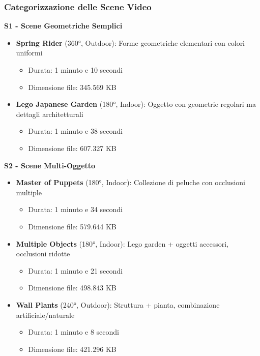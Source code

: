 \subsubsection{Categorizzazione delle Scene Video}

\textbf{S1 - Scene Geometriche Semplici}
\begin{itemize}
	\item \textbf{Spring Rider} (360°, Outdoor): Forme geometriche elementari con colori uniformi
	\begin{itemize}
		\item Durata: 1 minuto e 10 secondi
		\item Dimensione file: 345.569 KB
	\end{itemize}
	
	\item \textbf{Lego Japanese Garden} (180°, Indoor): Oggetto con geometrie regolari ma dettagli architetturali
	\begin{itemize}
		\item Durata: 1 minuto e 38 secondi  
		\item Dimensione file: 607.327 KB
	\end{itemize}
\end{itemize}

\textbf{S2 - Scene Multi-Oggetto}
\begin{itemize}
	\item \textbf{Master of Puppets} (180°, Indoor): Collezione di peluche con occlusioni multiple
	\begin{itemize}
		\item Durata: 1 minuto e 34 secondi
		\item Dimensione file: 579.644 KB
	\end{itemize}
	
	\item \textbf{Multiple Objects} (180°, Indoor): Lego garden + oggetti accessori, occlusioni ridotte  
	\begin{itemize}
		\item Durata: 1 minuto e 21 secondi
		\item Dimensione file: 498.843 KB
	\end{itemize}
	
	\item \textbf{Wall Plants} (240°, Outdoor): Struttura + pianta, combinazione artificiale/naturale
	\begin{itemize}
		\item Durata: 1 minuto e 8 secondi
		\item Dimensione file: 421.296 KB
	\end{itemize}
\end{itemize}

